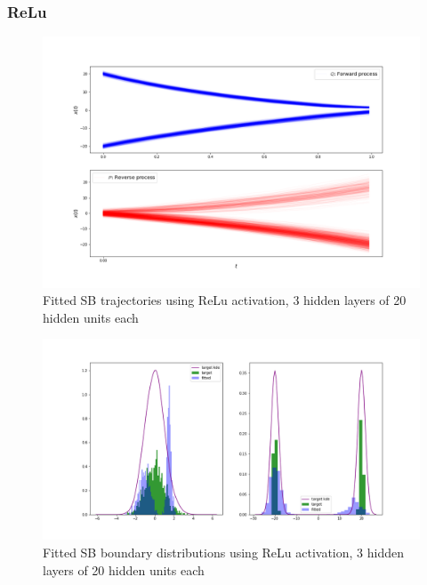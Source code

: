 \documentclass[a4paper,12pt,twoside,openright]{report}
\theoremstyle{definition}
\begin{document}
\subsubsection{ReLu}
\begin{figure}
    \centering
    \includegraphics[scale=0.4,trim={4.3cm 1cm 2.5cm 0}, clip]{images/Control/bimod_final_relu_trajectories.png}
    \caption{ Fitted SB  trajectories using ReLu activation, 3 hidden layers of 20 hidden units each}
    \label{fig:trajectoriesbimodrelunn}
\end{figure}
\begin{figure}
    \centering
    \includegraphics[scale=0.4,trim={4.3cm 1cm 2.5cm 0}, clip]{images/Control/bimod_final_relu_boundaires.png}
    \caption{ Fitted SB  boundary distributions using ReLu activation, 3 hidden layers of 20 hidden units each}
    \label{fig:boundsbimodrelunn}
\end{figure}
\end{document}
